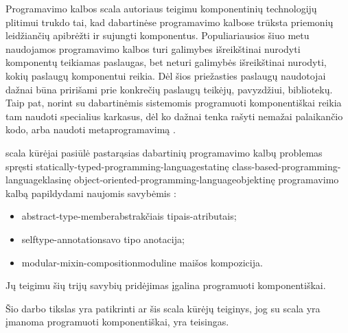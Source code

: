 Programavimo kalbos \gls{scala}{} autoriaus  teigimu komponentinių technologijų plitimui trukdo
tai, kad dabartinėse programavimo kalbose trūksta priemonių leidžiančių
apibrėžti ir sujungti komponentus\cite{odersky:scala-experiment}.
Populiariausios šiuo metu naudojamos programavimo kalbos turi galimybes
išreikštinai nurodyti komponentų teikiamas paslaugas, bet neturi
galimybės išreikštinai nurodyti, kokių paslaugų
komponentui reikia. Dėl šios priežasties paslaugų naudotojai dažnai
būna pririšami prie konkrečių paslaugų teikėjų, pavyzdžiui,
bibliotekų\cite{scalable-component-abstractions}. Taip pat, norint
su dabartinėmis sistemomis programuoti komponentiškai reikia
tam naudoti specialius karkasus, dėl ko dažnai tenka rašyti
nemažai palaikančio  kodo, arba naudoti
metaprogramavimą \cite{extensible-software-components}.

\gls{scala}{} kūrėjai pasiūlė pastarąsias
dabartinių programavimo kalbų problemas spręsti
\gls{statically-typed-programming-language}{statinę}
\gls{class-based-programming-language}{klasinę}
\gls{object-oriented-programming-language}{objektinę} programavimo
kalbą papildydami naujomis savybėmis
\cite{scalable-component-abstractions}:
\begin{itemize}
  \item \gls{abstract-type-member}{abstrakčiais tipais-atributais};
  \item \gls{selftype-annotation}{savo tipo anotacija};
  \item \gls{modular-mixin-composition}{moduline maišos kompozicija}.
\end{itemize}
Jų teigimu \cite[1]{scalable-component-abstractions} šių trijų savybių
pridėjimas įgalina programuoti komponentiškai.

Šio darbo tikslas yra patikrinti ar šis \gls{scala}{}
kūrėjų teiginys, jog su \gls{scala}{} yra įmanoma
programuoti komponentiškai, yra teisingas.

